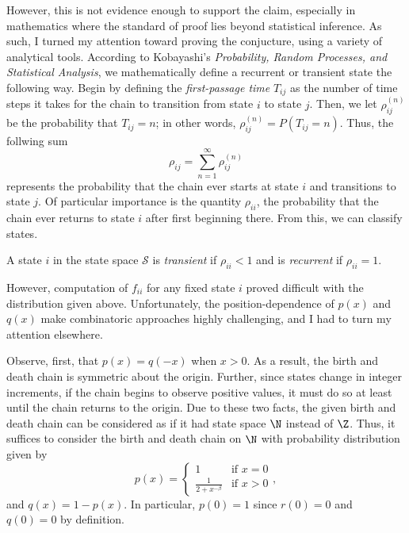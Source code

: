However, this is not evidence enough to support the claim, especially in mathematics where the standard
of proof lies beyond statistical inference. As such, I turned my attention toward proving the
conjucture, using a variety of analytical tools. According to Kobayashi's \emph{Probability, Random
Processes, and Statistical Analysis}, we mathematically define a recurrent or transient state the
following way. Begin by defining the \emph{first-passage time} $T_{ij}$ as the number of time steps it
takes for the chain to transition from state $i$ to state $j$. Then, we let $\rho_{ij}^{(n)}$ be the
probability that $T_{ij} = n$; in other words, $\rho_{ij}^{(n)} = P(T_{ij} = n)$. Thus, the follwing sum
\[
    \rho_{ij} = \sum_{n=1}^{\infty} \rho_{ij}^{(n)}  
\]
represents the probability that the chain ever starts at state $i$ and transitions to state $j$. Of
particular importance is the quantity $\rho_{ii}$, the probability that the chain ever returns to state $i$
after first beginning there. From this, we can classify states.
\begin{definition}
    A state $i$ in the state space $\mathcal{S}$ is \emph{transient} if $\rho_{ii} < 1$ and is
    \emph{recurrent} if $\rho_{ii} = 1$.
\end{definition}
However, computation of $f_{ii}$ for any fixed state $i$ proved difficult with the distribution given
above.  Unfortunately, the position-dependence of $p(x)$ and $q(x)$ make combinatoric approaches highly
challenging, and I had to turn my attention elsewhere.

Observe, first, that $p(x) = q(-x)$ when $x > 0$. As a result, the birth and death chain is symmetric
about the origin. Further, since states change in integer increments, if the chain begins to observe
positive values, it must do so at least until the chain returns to the origin. Due to these two facts,
the given birth and death chain can be considered as if it had state space $\N$ instead of $\Z$. Thus,
it suffices to consider the birth and death chain on $\N$ with probability distribution given by
\[
    p(x) = \begin{cases}
        1 & \text{if } x = 0 \\
        \frac{1}{2+x^{-\beta}} & \text{if } x > 0
    \end{cases},
\]
and $q(x) = 1 - p(x)$. In particular, $p(0) = 1$ since $r(0) = 0$ and $q(0) = 0$ by definition.

